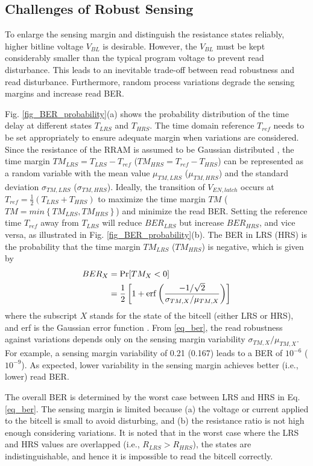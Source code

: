 \subsection{Challenges of Robust Sensing}
\label{challenges}

To enlarge the sensing margin and distinguish the resistance states reliably, higher bitline voltage $V_{BL}$ is desirable. However, the $V_{BL}$ must be kept considerably smaller than the typical program voltage to prevent read disturbance. This leads to an inevitable trade-off between read robustness and read disturbance.
Furthermore, random process variations degrade the sensing margins and increase read BER.

Fig. \ref{fig_BER_probability}(a) shows the probability distribution of the time delay at different states $T_{LRS}$ and $T_{HRS}$. 
The time domain reference $T_{ref}$ needs to be set appropriately to ensure adequate margin when variations are considered. 
Since the resistance of the RRAM is assumed to be Gaussian distributed \cite{6948806}, the time margin $TM_{LRS}=T_{LRS}-T_{ref}$ ($TM_{HRS}=T_{ref}-T_{HRS}$) can be represented as a random variable with the mean value $\mu_{TM,LRS}$ ($\mu_{TM,HRS}$) and the standard deviation $\sigma_{TM,LRS}$ ($\sigma_{TM,HRS}$). 
Ideally, the transition of $V_{EN,latch}$ occurs at $T_{ref}=\frac{1}{2}(T_{LRS}+T_{HRS})$ to maximize the time margin $TM$ ($TM=min	\left\{TM_{LRS}, TM_{HRS}\right\}$) and minimize the read BER.
Setting the reference time $T_{ref}$ away from $T_{LRS}$ will reduce $BER_{LRS}$ but increase $BER_{HRS}$, and vice versa, as illustrated in Fig. \ref{fig_BER_probability}(b).
The BER in LRS (HRS) is the probability that the time margin $TM_{LRS}$ ($TM_{HRS}$) is negative, which is given by \cite{trinh2018time}
\begin{align}
\label{eq_ber}
BER_X &= {\rm Pr}[TM_X<0] \notag \\
      &= \frac{1}{2}\left[1+{\rm erf}\left(\frac{-1/\sqrt{2}}{\sigma_{TM,X}/\mu_{TM,X}}\right)\right]
\end{align}
where the subscript $X$ stands for the state of the bitcell (either LRS or HRS), and erf is the Gaussian error function \cite{walpole1993probability}. 
From \eqref{eq_ber}, the read robustness against variations depends only on the sensing margin variability $\sigma_{TM,X}/\mu_{TM,X}$.
For example, a sensing margin variability of 0.21 (0.167) leads to a BER of $10^{-6}$ ($10^{-9}$).
As expected, lower variability in the sensing margin achieves better (i.e., lower) read BER. 

The overall BER is determined by the worst case between LRS and HRS in Eq. \eqref{eq_ber}. 
The sensing margin is limited because (a) the voltage or current applied to the bitcell is small to avoid disturbing, and (b) the resistance ratio is not high enough considering variations.
It is noted that in the worst case where the LRS and HRS values are overlapped (i.e., $R_{LRS}>R_{HRS}$), the states are indistinguishable, and hence it is impossible to read the bitcell correctly. 


